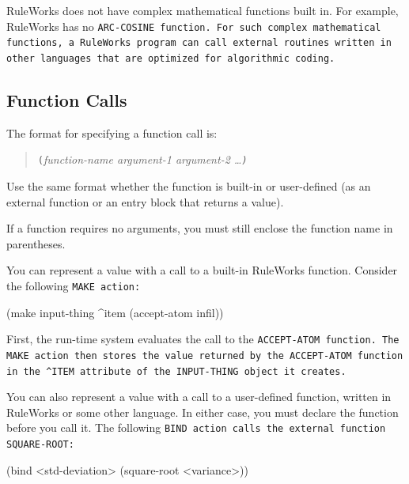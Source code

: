 \begin{note}
  RuleWorks does not have complex mathematical functions built in. For
  example, RuleWorks has no \tt{ARC-COSINE} function.  For such
  complex mathematical functions, a RuleWorks program can call
  external routines written in other languages that are optimized for
  algorithmic coding.
\end{note}

\subsection{Function Calls}

The format for specifying a function call is:
\begin{quote}
\verb|(|\it{function-name} \it{argument-1} \it{argument-2} \ldots\verb|)|
\end{quote}
Use the same format whether the function is built-in or user-defined
(as an external function or an entry block that returns a value).
\begin{note}
  If a function requires no arguments, you must still enclose the
  function name in parentheses.
\end{note}
You can represent a value with a call to a built-in RuleWorks
function. Consider the following \tt{MAKE} action:
\begin{qv}
(make input-thing ^item (accept-atom infil))
\end{qv}
First, the run-time system evaluates the call to the \tt{ACCEPT-ATOM}
function. The \tt{MAKE} action then stores the value returned by the
\tt{ACCEPT-ATOM} function in the \verb|^ITEM| attribute of the
\tt{INPUT-THING} object it creates.

You can also represent a value with a call to a user-defined function,
written in RuleWorks or some other language. In either case, you must
declare the function before you call it. The following \tt{BIND}
action calls the external function \verb|SQUARE-ROOT|:
\begin{qv}
(bind <std-deviation> (square-root <variance>))
\end{qv}

